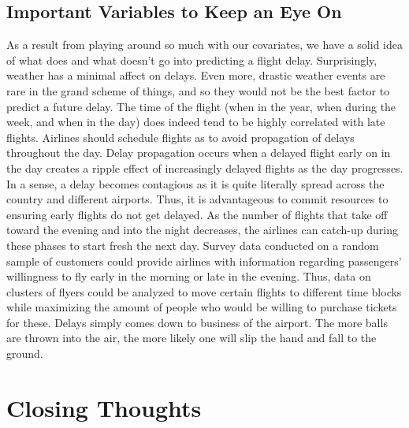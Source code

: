 \documentclass[12pt, a4paper, openany]{book}
\newcommand\tab[1][1cm]{\hspace*{#1}}
\begin{document}
	\section{Important Variables to Keep an Eye On}
	\tab As a result from playing around so much with our covariates, we have a solid idea of what does and what doesn’t go into predicting a flight delay. Surprisingly, weather has a minimal affect on delays. Even more, drastic weather events are rare in the grand scheme of things, and so they would not be the best factor to predict a future delay. The time of the flight (when in the year, when during the week, and when in the day) does indeed tend to be highly correlated with late flights. Airlines should schedule flights as to avoid propagation of delays throughout the day. Delay propagation occurs when a delayed flight early on in the day creates a ripple effect of increasingly delayed flights as the day progresses. In a sense, a delay becomes contagious as it is quite literally spread across the country and different airports. Thus, it is advantageous to commit resources to ensuring early flights do not get delayed. As the number of flights that take off toward the evening and into the night decreases, the airlines can catch-up during these phases to start fresh the next day. Survey data conducted on a random sample of customers could provide airlines with information regarding passengers’ willingness to fly early in the morning or late in the evening. Thus, data on clusters of flyers could be analyzed to move certain flights to different time blocks while maximizing the amount of people who would be willing to purchase tickets for these. Delays simply comes down to business of the airport. The more balls are thrown into the air, the more likely one will slip the hand and fall to the ground. 
\chapter{Closing Thoughts}
\end{document}
